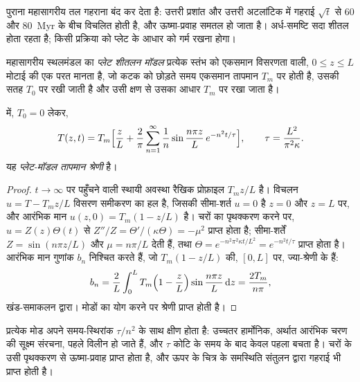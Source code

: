 पुराना महासागरीय तल गहराना बंद कर देता है: उत्तरी प्रशांत और उत्तरी अटलांटिक में
गहराई $\sqrt t$ से 60 और \qty{80}{Myr} के बीच विचलित होती है, और ऊष्मा-प्रवाह
समतल हो जाता है। अर्ध-समष्टि सदा शीतल होता रहता है;
किसी प्रक्रिया को प्लेट के आधार को गर्म रखना होगा।

\begin{definition}[प्लेट शीतलन मॉडल]\label{def:b3:lithosphere-thermal-models:plate}
महासागरीय स्थलमंडल का \emph{प्लेट शीतलन मॉडल} प्रत्येक स्तंभ को
एकसमान विसरणता वाली, $0 \le z \le L$ मोटाई की एक परत मानता है,
जो कटक को छोड़ते समय एकसमान तापमान $T_m$ पर होती है,
उसकी सतह $T_0$ पर रखी जाती है और उसी क्षण से उसका आधार $T_m$ पर रखा जाता है।
\end{definition}

\begin{theorem}[प्लेट-मॉडल तापमान श्रेणी]\label{thm:b3:lithosphere-thermal-models:plate-series}
 में, $T_0 = 0$ लेकर,
\[
  T(z, t) = T_m\Bigl[\frac zL + \frac2\pi\sum_{n=1}^\infty\frac1n
  \sin\frac{n\pi z}{L}\,e^{-n^2t/\tau}\Bigr],\qquad
  \tau = \frac{L^2}{\pi^2\kappa} .
\]
यह \emph{प्लेट-मॉडल तापमान श्रेणी} है।
\end{theorem}

\begin{proof}
$t \to \infty$ पर पहुँचने वाली स्थायी अवस्था रैखिक प्रोफ़ाइल $T_mz/L$ है।
विचलन $u = T - T_mz/L$ विसरण समीकरण का हल है, जिसकी सीमा-शर्त $u = 0$ है
$z = 0$ और $z = L$ पर, और आरंभिक मान $u(z, 0) = T_m(1 - z/L)$ है। चरों
का पृथक्करण करने पर, $u = Z(z)\Theta(t)$ से $Z''/Z = \Theta'/(\kappa\Theta) = -\mu^2$ प्राप्त होता है;
सीमा-शर्तें $Z = \sin(n\pi z/L)$ और $\mu = n\pi/L$ देती हैं, तथा
$\Theta = e^{-n^2\pi^2\kappa t/L^2} = e^{-n^2t/\tau}$ प्राप्त होता है। आरंभिक मान
गुणांक $b_n$ निश्चित करते हैं, जो $T_m(1 - z/L)$ की, $[0, L]$ पर, ज्या-श्रेणी के हैं:
\[
  b_n = \frac2L\int_0^LT_m\Bigl(1 - \frac zL\Bigr)\sin\frac{n\pi z}{L}\,\mathrm dz
  = \frac{2T_m}{n\pi},
\]
खंड-समाकलन द्वारा। मोडों का योग करने पर श्रेणी प्राप्त होती है।
\end{proof}

प्रत्येक मोड अपने समय-स्थिरांक $\tau/n^2$ के साथ क्षीण होता है: उच्चतर हार्मोनिक,
अर्थात आरंभिक चरण की सूक्ष्म संरचना, पहले विलीन हो जाते हैं, और $\tau$ कोटि के समय के बाद
केवल पहला बचता है। चरों के उसी पृथक्करण से ऊष्मा-प्रवाह प्राप्त होता है, और
ऊपर के चित्र के समस्थिति संतुलन द्वारा गहराई भी प्राप्त होती है।

